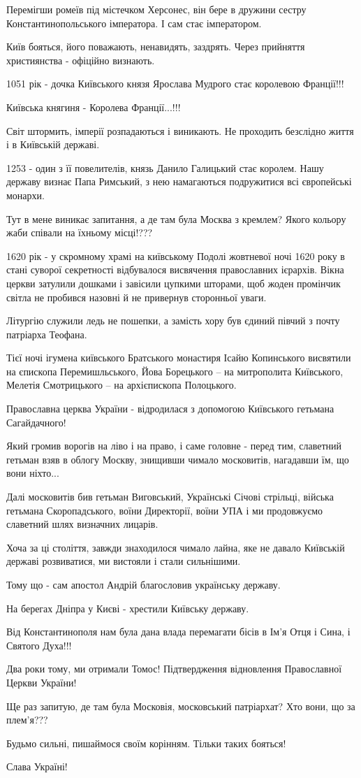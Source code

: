 Перемігши ромеїв під містечком Херсонес, він бере в дружини сестру
Константинопольського імператора. І сам стає імператором.

Київ бояться, його поважають, ненавидять, заздрять. Через прийняття
християнства - офіційно визнають.

1051 рік - дочка Київського князя Ярослава Мудрого стає королевою Франції!!!

Київська княгиня - Королева Франції...!!!

Світ штормить, імперії розпадаються і виникають. Не проходить безслідно життя і
в Київській державі.

1253 - один з її повелителів, князь Данило Галицький стає королем. Нашу державу
визнає Папа Римський, з нею намагаються подружитися всі європейські монархи.

Тут в мене виникає запитання, а де там була Москва з кремлем?  Якого кольору
жаби співали на їхньому місці!???

1620  рік - у скромному храмі на київському Подолі жовтневої ночі 1620 року в
стані суворої секретності відбувалося висвячення православних ієрархів. Вікна
церкви затулили дошками і завісили цупкими шторами, щоб жоден промінчик світла
не пробився назовні й не привернув сторонньої уваги.

Літургію служили ледь не пошепки, а замість хору був єдиний півчий з почту
патріарха Теофана. 

Тієї ночі ігумена київського Братського монастиря Ісайю Копинського висвятили
на єпископа Перемишльського, Йова Борецького – на митрополита Київського,
Мелетія Смотрицького – на архієпископа Полоцького.

Православна церква України - відродилася з допомогою Київського гетьмана
Сагайдачного! 

Який громив ворогів на ліво і на право, і саме головне - перед тим, славетний
гетьман взяв в облогу Москву, знищивши чимало московитів, нагадавши їм, що вони
ніхто...

Далі московитів бив  гетьман Виговський, Українські Січові стрільці, війська
гетьмана Скоропадського, воїни Директорії, воїни УПА і ми продовжуємо славетний
шлях визначних лицарів.

Хоча за ці століття, завжди знаходилося чимало лайна, яке не давало Київській
державі розвиватися, ми вистояли і стали сильнішими.

Тому що - сам апостол Андрій благословив українську державу.

На берегах Дніпра у Києві - хрестили Київську державу.

Від Константинополя нам була дана влада перемагати бісів в Ім'я Отця і Сина, і
Святого Духа!!!

Два роки тому, ми отримали Томос! Підтвердження відновлення Православної Церкви
України!

Ще раз запитую, де там була Московія, московський патріархат? Хто вони, що за
плем'я???

Будьмо сильні, пишаймося своїм корінням. Тільки таких бояться! 

Слава Україні!

